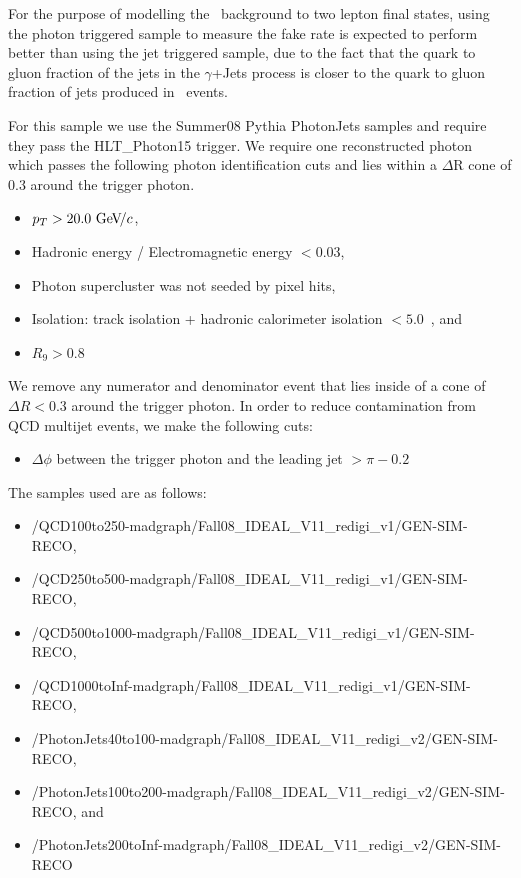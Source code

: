 \documentclass{cmspaper}
\begin{document}
For the purpose of modelling the \WPlusJets\ background to two lepton final states, using the photon triggered sample to measure the fake rate is expected to perform better than using the jet triggered sample, due to the fact that the quark to gluon fraction of the jets in the $\gamma$+Jets process is closer to the quark to gluon fraction of jets produced in \WPlusJets\ events. 

For this sample we use the Summer08 Pythia PhotonJets samples and require they pass the HLT\_Photon15 trigger. We require one reconstructed photon which passes the following photon identification cuts and lies within a $\Delta$R cone of 0.3 around the trigger photon\cite{PhotonID}.

\begin{itemize}
\item $p_T > 20.0~\mathrm{Ge\kern -0.1em V}\!/c$,
\item Hadronic energy / Electromagnetic energy $< 0.03$,
\item Photon supercluster was not seeded by pixel hits,
\item Isolation:  track isolation  + hadronic calorimeter isolation $< 5.0$~\GeV, and
\item $R_9 > 0.8$
\end{itemize}

We remove any numerator and denominator event that lies inside of a cone of $\Delta R < 0.3$ around the trigger photon. In order to reduce contamination from QCD multijet events, we make the following cuts:

\begin{itemize}
\item $\Delta\phi$ between the trigger photon and the leading jet $> \pi - 0.2$ \cite{JetEnergyCalibrationWithPhotonJet}
\end{itemize}

The samples used are as follows:
\begin{itemize}
\item /QCD100to250-madgraph/Fall08\_IDEAL\_V11\_redigi\_v1/GEN-SIM-RECO,
\item /QCD250to500-madgraph/Fall08\_IDEAL\_V11\_redigi\_v1/GEN-SIM-RECO,
\item /QCD500to1000-madgraph/Fall08\_IDEAL\_V11\_redigi\_v1/GEN-SIM-RECO,
\item /QCD1000toInf-madgraph/Fall08\_IDEAL\_V11\_redigi\_v1/GEN-SIM-RECO,
\item /PhotonJets40to100-madgraph/Fall08\_IDEAL\_V11\_redigi\_v2/GEN-SIM-RECO,
\item /PhotonJets100to200-madgraph/Fall08\_IDEAL\_V11\_redigi\_v2/GEN-SIM-RECO, and 
\item /PhotonJets200toInf-madgraph/Fall08\_IDEAL\_V11\_redigi\_v2/GEN-SIM-RECO
\end{itemize}
\end{document}
